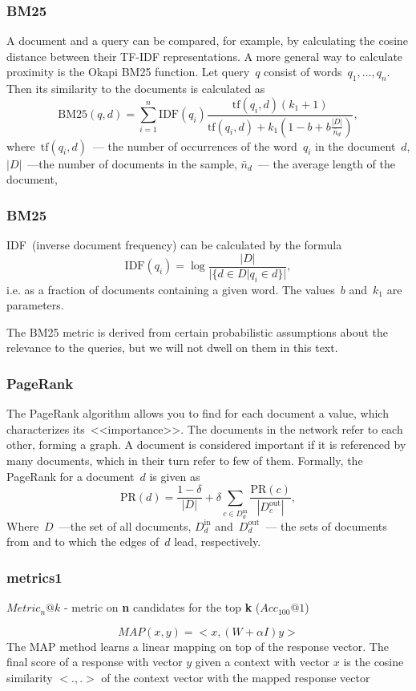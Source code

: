 \documentclass{beamer}
\begin{document}
\begin{frame}
\frametitle{BM25}
A document and a query can be compared, for example, by calculating the cosine distance
between their TF-IDF representations.
A more general way to calculate proximity is the Okapi BM25 function.
Let query~$q$ consist of words~$q_1, \dots, q_n$.
Then its similarity to the documents is calculated as
\[
    \text{BM25}(q, d)
    =
    \sum_{i = 1}^{n}
        \text{IDF}(q_i)
        \frac{
            \text{tf}(q_i, d)
            (k_1 + 1)
        }{
            \text{tf}(q_i, d)
            +
            k_1 \left(
                1 - b + b \frac{|D|}{\bar n_d}
            \right)
        },
\]
where~$\text{tf}(q_i, d)$~--- the number of occurrences of the word~$q_i$ in the document~$d$,
$|D|$~---the number of documents in the sample,
$\bar n_d$~--- the average length of the document,
\end{frame}
\begin{frame}
\frametitle{BM25}
IDF~(inverse document frequency) can be calculated by the formula
\[
    \text{IDF}(q_i)
    =
    \log\frac{
        |D|
    }{
        |\{d \in D | q_i \in d\}|
    },
\]
i.e. as a fraction of documents containing a given word.
The values~$b$ and~$k_1$ are parameters.

The BM25 metric is derived from certain probabilistic assumptions about the relevance
to the queries, but we will not dwell on them in this text.
\end{frame}
\begin{frame}
\frametitle{PageRank}
The PageRank algorithm allows you to find for each document a value,
which characterizes its~<<importance>>.
The documents in the network refer to each other, forming a graph.
A document is considered important if it is referenced by many documents,
which in their turn refer to few of them.
Formally, the PageRank for a document~$d$ is given as
$$
    \text{PR}(d)
    =
    \frac{1 - \delta}{|D|}
    +
    \delta
    \sum_{c \in D_d^\text{in}}
        \frac{
            \text{PR}(c)
        }{
            |D_c^\text{out}|
        },
$$
Where~$D$~---the set of all documents,
$D_d^\text{in}$ and~$D_d^\text{out}$~--- the sets of documents from and to which the edges of~$d$ lead, respectively.
\end{frame}
\begin{frame}
\frametitle{metrics1}
$Metric_n@k$ - metric on \textbf{n} candidates for the top \textbf{k} ($Acc_{100}@1$)

$$
MAP(x, y) = <x, (W + \alpha I)y>
$$
The MAP method learns a linear mapping on top
of the response vector. The final score of a response
with vector $y$ given a context with vector $x$ is the
cosine similarity $<.,.>$ of the context vector with
the mapped response vector
\end{frame}
\end{document}

